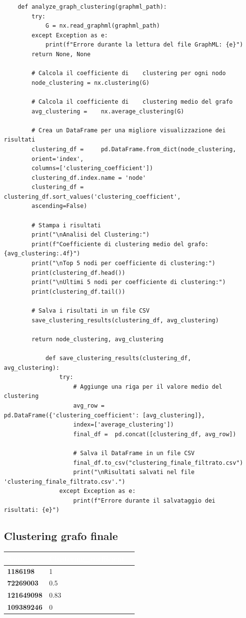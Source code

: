 \documentclass[12pt]{article}
\begin{document}
	\begin{lstlisting}
	def analyze_graph_clustering(graphml_path):
		try:
			G = nx.read_graphml(graphml_path)
		except Exception as e:
			print(f"Errore durante la lettura del file GraphML: {e}")
		return None, None
		
		# Calcola il coefficiente di 	clustering per ogni nodo
		node_clustering = nx.clustering(G)
		
		# Calcola il coefficiente di 	clustering medio del grafo
		avg_clustering = 	nx.average_clustering(G)
		
		# Crea un DataFrame per una migliore visualizzazione dei risultati
		clustering_df = 	pd.DataFrame.from_dict(node_clustering, 
		orient='index', 
		columns=['clustering_coefficient'])
		clustering_df.index.name = 'node'
		clustering_df = 	clustering_df.sort_values('clustering_coefficient', 
		ascending=False)
		
		# Stampa i risultati
		print("\nAnalisi del Clustering:")
		print(f"Coefficiente di clustering medio del grafo: {avg_clustering:.4f}")
		print("\nTop 5 nodi per coefficiente di clustering:")
		print(clustering_df.head())
		print("\nUltimi 5 nodi per coefficiente di clustering:")
		print(clustering_df.tail())
		
		# Salva i risultati in un file CSV
		save_clustering_results(clustering_df, avg_clustering)
		
		return node_clustering, avg_clustering
		
			def save_clustering_results(clustering_df, avg_clustering):
				try:
					# Aggiunge una riga per il valore medio del clustering
					avg_row = 		pd.DataFrame({'clustering_coefficient': [avg_clustering]}, 
					index=['average_clustering'])
					final_df = 	pd.concat([clustering_df, avg_row])
		
					# Salva il DataFrame in un file CSV
					final_df.to_csv("clustering_finale_filtrato.csv")
					print("\nRisultati salvati nel file 'clustering_finale_filtrato.csv'.")
				except Exception as e:
					print(f"Errore durante il salvataggio dei risultati: {e}")
	\end{lstlisting}
	\subsection{Clustering grafo finale}
	\begin{table}[h!]
		\centering
		\begin{tabular}{|p{5cm}|p{5cm}|p{4cm}|}
			\hline
			\cellcolor{darkblue}\textcolor{white}{\textbf{Source}} & 
			\cellcolor{darkblue}\textcolor{white}{\textbf{Clustering\_coefficient}} \\
			\hline
			\textbf{1186198} & 1 \\
			\hline
			\textbf{72269003} & 0.5\\
			\hline
			\textbf{121649098} & 0.83\\
			\hline
			\textbf{109389246} & 0\\
			\hline
		\end{tabular}
	\end{table}
\end{document}
